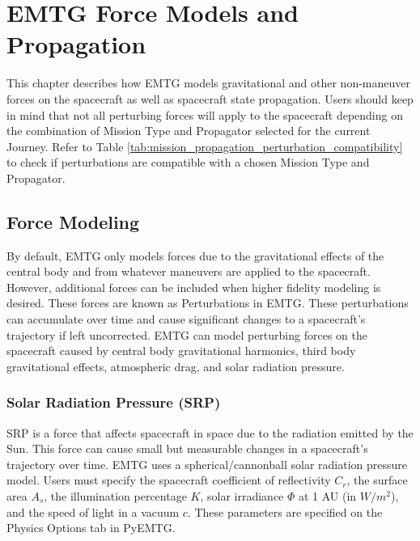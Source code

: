 \chapter{EMTG Force Models and Propagation}
\label{chap:force_model_prop}
This chapter describes how \ac{EMTG} models gravitational and other non-maneuver forces on the spacecraft as well as spacecraft state propagation. Users should keep in mind that not all perturbing forces will apply to the spacecraft depending on the combination of Mission Type and Propagator selected for the current Journey. Refer to Table \ref{tab:mission_propagation_perturbation_compatibility} to check if perturbations are compatible with a chosen Mission Type and Propagator.

\section{Force Modeling}
\label{sec:force_model}
By default, \ac{EMTG} only models forces due to the gravitational effects of the central body and from whatever maneuvers are applied to the spacecraft.
However, additional forces can be included when higher fidelity modeling is desired. These forces are known as Perturbations in \ac{EMTG}. These perturbations can accumulate over time and cause significant changes to a spacecraft's trajectory if left uncorrected. \ac{EMTG} can model perturbing forces on the spacecraft caused by central body gravitational harmonics, third body gravitational effects, atmospheric drag, and solar radiation pressure.  

        \subsection{Solar Radiation Pressure (SRP)}
        \label{sec:force_model_srp}

        \ac{SRP} is a force that affects spacecraft in space due to the radiation emitted by the Sun. This force can cause small but measurable changes in a spacecraft's trajectory over time. \ac{EMTG} uses a spherical/cannonball solar radiation pressure model. Users must specify the spacecraft coefficient of reflectivity $C_r$, the surface area $A_s$, the illumination percentage $K$, solar irradiance $\Phi$ at 1 AU (in $W/m^2$), and the speed of light in a vacuum $c$. These parameters are specified on the Physics Options tab in PyEMTG.

